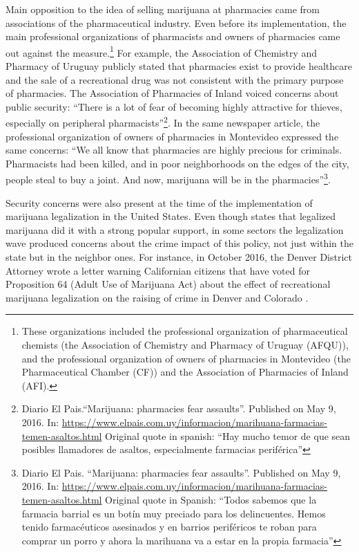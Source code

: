 \documentclass[11pt]{article}
\begin{document}
Main opposition to the idea of selling marijuana at pharmacies came from associations of the pharmaceutical industry. Even before its implementation, the main professional organizations of pharmacists and owners of pharmacies came out against the measure.\footnote{These organizations included the professional organization of pharmaceutical chemists (the Association of Chemistry and Pharmacy of Uruguay (AFQU)), and the professional organization of owners of pharmacies in Montevideo (the Pharmaceutical Chamber (CF)) and the Association of Pharmacies of Inland (AFI).} For example, the Association of Chemistry and Pharmacy of Uruguay publicly stated that pharmacies exist to provide healthcare and the sale of a recreational drug was not consistent with the primary purpose of pharmacies. The Association of Pharmacies of Inland voiced concerns about public security: ``There is a lot of fear of becoming highly attractive for thieves, especially on peripheral pharmacists''\footnote{Diario El Pais.``Marijuana: pharmacies fear assaults''. Published on May 9, 2016. In: \url{https://www.elpais.com.uy/informacion/marihuana-farmacias-temen-asaltos.html} Original quote in spanish: ``Hay mucho temor de que sean posibles llamadores de asaltos, especialmente farmacias periférica''}. In the same newspaper article, the professional organization of owners of pharmacies in Montevideo expressed the same concerns: ``We all know that pharmacies are highly precious for criminals. Pharmacists had been killed, and in poor neighborhoods on the edges of the city, people steal to buy a joint. And now, marijuana will be in the pharmacies''\footnote{Diario El Pais. ``Marijuana: pharmacies fear assaults''. Published on May 9, 2016. In: \url{https://www.elpais.com.uy/informacion/marihuana-farmacias-temen-asaltos.html} Original quote in Spanish:  ``Todos sabemos que la farmacia barrial es un botín muy preciado para los delincuentes. Hemos tenido farmacéuticos asesinados y en barrios periféricos te roban para comprar un porro y ahora la marihuana va a estar en la propia farmacia''}.

Security concerns were also present at the time of the implementation of marijuana legalization in the United States. Even though states that legalized marijuana did it with a strong popular support, in some sectors the legalization wave produced concerns about the crime impact of this policy, not just within the state but in the neighbor ones. For instance, in October 2016, the Denver District Attorney wrote a letter warning Californian citizens that have voted for Proposition 64 (Adult Use of Marijuana Act) about the effect of recreational marijuana legalization on the raising of crime in Denver and Colorado \citep{dragone2019crime}.
\end{document}
